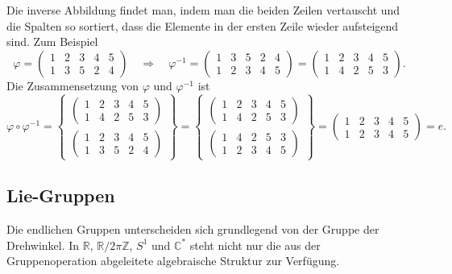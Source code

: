 Die inverse Abbildung findet man, indem man die beiden Zeilen vertauscht
und die Spalten so sortiert, dass die Elemente in der ersten Zeile
wieder aufsteigend sind.
Zum Beispiel
\[
\varphi
=
\begin{pmatrix}
1&2&3&4&5\\
1&3&5&2&4
\end{pmatrix}
\quad\Rightarrow\quad
\varphi^{-1}
=
\begin{pmatrix}
1&3&5&2&4\\
1&2&3&4&5
\end{pmatrix}
=
\begin{pmatrix}
1&2&3&4&5\\
1&4&2&5&3
\end{pmatrix}.
\]
Die Zusammensetzung von $\varphi$ und $\varphi^{-1}$ ist
\[
\varphi\circ\varphi^{-1}
=
\left\{
\begin{array}{c}
\displaystyle
\begin{pmatrix}
1&2&3&4&5\\
1&4&2&5&3
\end{pmatrix}
\\
\displaystyle
\begin{pmatrix}
1&2&3&4&5\\
1&3&5&2&4
\end{pmatrix}
\end{array}
\right\}
=
\left\{
\begin{array}{c}
\displaystyle
\begin{pmatrix}
1&2&3&4&5\\
1&4&2&5&3
\end{pmatrix}
\\
\displaystyle
\begin{pmatrix}
1&4&2&5&3\\
1&2&3&4&5
\end{pmatrix}
\end{array}
\right\}
=
\begin{pmatrix}
1&2&3&4&5\\
1&2&3&4&5
\end{pmatrix}
=
e.
\]


%
%
\subsection{Lie-Gruppen
\label{buch:gruppen:subsection:lie-gruppen}}
Die endlichen Gruppen unterscheiden sich grundlegend von der Gruppe
der Drehwinkel.
In $\mathbb{R}$, $\mathbb{R}/2\pi\mathbb{Z}$, $S^1$ und $\mathbb{C}^*$
steht nicht nur die aus der Gruppenoperation abgeleitete algebraische
Struktur zur Verfügung.

